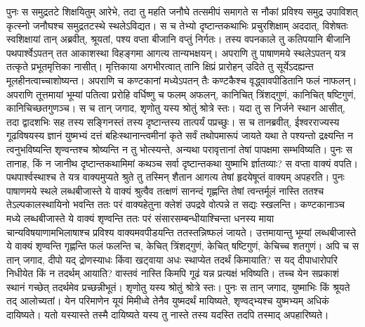 \adhyAya
{}
\vakya पुनः स समुद्रतटे शिक्षयितुम् आरेभे, तदा तु महति जनौघे तत्समीपं समागते स नौकां प्रविश्य समुद्र उपाविशत् कृत्स्नो जनौघश्च समुद्रतटस्थे स्थलेऽविद्यत।
\vakya स च तेभ्यो दृष्टान्तकथाभिः प्रचुरशिक्षाम् अददात्, विशेषतः स्वशिक्षायां तान् अब्रवीत्,
\vakya श्रूयतां, पश्य वप्ता बीजानि वप्तुं निर्गतः।
\vakya तस्य वपनकाले तु कतिपयानि बीजानि पथपार्श्वेऽपतन् तत आकाशस्था विहङ्गमा आगत्य तान्यभक्षयन्।
\vakya अपराणि तु पाषाणमये स्थलेऽपतन् यत्र तत्कृते प्रभूतमृत्तिका नासीत्।
\vakya मृत्तिकाया अगभीरत्वात् तानि क्षिप्रं प्रारोहन् उदिते तु सूर्येऽदह्यन्त मूलहीनत्वाच्चाशोष्यन्त।
\vakya अपराणि च कण्टकानां मध्येऽपतन् तैः कण्टकैश्च वृद्ध्वावपीडितानि फलं नाफलन्।
\vakya अपराणि तूत्तमायां भूम्यां पतित्वा प्ररोहि वर्धिष्णु च फलम् अफलन्, कानिचित् त्रिंशद्गुणं, कानिचित् षष्टिगुणं, कानिचिच्छतगुणञ्च।
\vakya स च तान् जगाद, शृणोतु यस्य श्रोतुं श्रोत्रे स्तः।
\vakya यदा तु स निर्जने स्थान आसीत्, तदा द्वादशभिः सह तस्य सङ्गिनस्तं तस्य दृष्टान्तस्य तात्पर्यं पप्रच्छुः।
\vakya स च तानब्रवीत्, ईश्वरराज्यस्य गूढविषयस्य ज्ञानं युष्मभ्यं दत्तं बहिःस्थानान्त्वमीनां कृते सर्वं तथोपमारूपं जायते यथा
\vakya ते पश्यन्तो द्रक्ष्यन्ति न त्वनुभविष्यन्ति शृण्वन्तश्च श्रोष्यन्ति न तु भोत्स्यन्ते, अन्यथा परावृत्तानां तेषां पापक्षमा सम्भविष्यति।
\vakya पुनः स तानाह, किं न जानीथ दृष्टान्तकथामिमां कथञ्च सर्वा दृष्टान्तकथा युष्माभि र्ज्ञातव्याः?
\vakya स वप्ता वाक्यं वपति।
\vakya पथपार्श्वस्थाश्च ते यत्र वाक्यमुप्यते श्रुते तु तस्मिन् शैतान आगत्य तेषां हृदयेषूप्तं वाक्यम् अपहरति।
\vakya पुनः पाषाणमये स्थले लब्धबीजास्ते ये वाक्यं श्रुत्वैव तत्क्षणं सानन्दं गृह्णन्ति
\vakya तेषां त्वन्तर्मूलं नास्ति ततश्च तेऽल्पकालस्थायिनो भवन्ति ततः परं वाक्यहेतुना क्लेशं उपद्रवे वोत्पन्ने त सद्यः स्खलन्ति।
\vakya कण्टकानाञ्च मध्ये लब्धबीजास्ते ये वाक्यं शृण्वन्ति
\vakya ततः परं संसारसम्बन्धीयाश्चिन्ता धनस्य माया चान्यविषयाणामभिलाषाश्च प्रविश्य वाक्यमवपीडयन्ति ततस्तन्निष्फलं जायते।
\vakya उत्तमायान्तु भूम्यां लब्धबीजास्ते ये वाक्यं शृण्वन्ति गृह्णन्ति फलं फलन्ति च, केचित् त्रिंशद्गुणं, केचित् षष्टिगुणं, केचिच्च शतगुणं।
\vakya अपि च स तान् जगाद, दीपो यद् द्रोणस्याधः किंवा खट्वाया अधः स्थाप्येत तदर्थं किमायाति? स यद् दीपाधारोपरि निधीयेत किं न तदर्थम् आयाति?
\vakya वास्तवं नास्ति किमपि गूढं यन्न प्रत्यक्षं भविष्यति। तच्च येन सप्रकाशं स्थानं गच्छेत् तदर्थमेव प्रच्छन्नीभूतं।
\vakya शृणोतु यस्य श्रोतुं श्रोत्रे स्तः।
\vakya पुनः स तान् जगाद, युष्माभिः किं श्रूयते तद् आलोच्यतां। येन परिमाणेन यूयं मिमीध्वे तेनैव युष्मदर्थं मायिष्यते, शृण्वद्भ्यश्च युष्मभ्यम् अधिकं दायिष्यते।
\vakya यतो यस्यास्ते तस्मै दायिष्यते यस्य तु नास्ते तस्य यदस्ति तदपि तस्माद् अपहारिष्यते।
